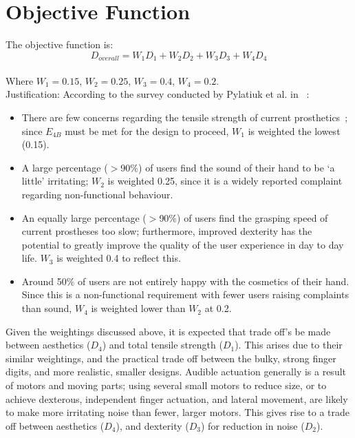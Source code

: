 \documentclass[12pt,3p]{elsarticle}
\begin{document}
\section{Objective Function}
\label{sec4} %
The objective function is: \\
$$D_{overall} = W_1D_1 + W_2D_2 + W_3D_3 + W_4D_4$$ \\
\phantom{aaa}Where $W_1 = 0.15$, $W_2 = 0.25$, $W_3 = 0.4$, $W_4 = 0.2$. \\

Justification: According to the survey conducted by Pylatiuk et al. in ~\cite{Pylatiuk}:
\begin{itemize}
\item There are few concerns regarding the tensile strength of current prosthetics~\cite{Peerdeman}; since $E_{4B}$ must be met for the design to proceed, $W_1$ is weighted the lowest (0.15).
\item A large percentage ($>$90\%) of users find the sound of their hand to be `a little' irritating; $W_2$ is weighted 0.25, since it is a widely reported complaint regarding non-functional behaviour.
\item An equally large percentage ($>$90\%) of users find the grasping speed of current prostheses too slow; furthermore, improved dexterity has the potential to greatly improve the quality of the user experience in day to day life. $W_3$ is weighted 0.4 to reflect this.
\item Around 50\% of users are not entirely happy with the cosmetics of their hand. Since this is a non-functional requirement with fewer users raising complaints than sound, $W_4$ is weighted lower than $W_2$ at 0.2.
\end{itemize}

Given the weightings discussed above, it is expected that trade off's be made between aesthetics ($D_4$) and total tensile strength ($D_1$). This arises due to their similar weightings, and the practical trade off between the bulky, strong finger digits, and more realistic, smaller designs. Audible actuation generally is a result of motors and moving parts; using several small motors to reduce size, or to achieve dexterous, independent finger actuation, and lateral movement,  are likely to make more irritating noise than fewer, larger motors. This gives rise to a trade off between aesthetics ($D_4$), and dexterity ($D_3$) for reduction in noise ($D_2$). 

\newpage
\appendix
\end{document}
